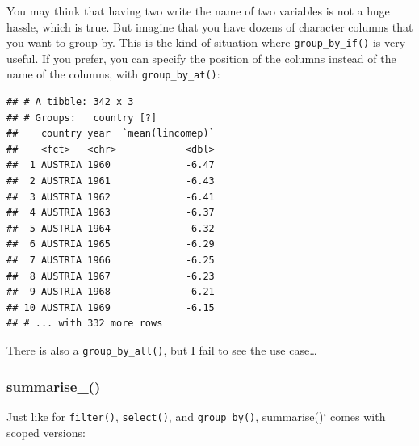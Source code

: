 \documentclass[]{gitbook}
\newenvironment{Shaded}{\begin{snugshade}}{\end{snugshade}}
\newcommand{\DecValTok}[1]{\textcolor[rgb]{0.00,0.00,0.81}{#1}}
\newcommand{\KeywordTok}[1]{\textcolor[rgb]{0.13,0.29,0.53}{\textbf{#1}}}
\newcommand{\NormalTok}[1]{#1}
\newcommand{\OperatorTok}[1]{\textcolor[rgb]{0.81,0.36,0.00}{\textbf{#1}}}
\newcommand{\StringTok}[1]{\textcolor[rgb]{0.31,0.60,0.02}{#1}}
\theoremstyle{definition}
\theoremstyle{definition}
\theoremstyle{definition}
\theoremstyle{remark}
\begin{document}
You may think that having two write the name of two variables is not a
huge hassle, which is true. But imagine that you have dozens of
character columns that you want to group by. This is the kind of
situation where \texttt{group\_by\_if()} is very useful. If you prefer,
you can specify the position of the columns instead of the name of the
columns, with \texttt{group\_by\_at()}:

\begin{Shaded}
\end{Shaded}

\begin{verbatim}
## # A tibble: 342 x 3
## # Groups:   country [?]
##    country year  `mean(lincomep)`
##    <fct>   <chr>            <dbl>
##  1 AUSTRIA 1960             -6.47
##  2 AUSTRIA 1961             -6.43
##  3 AUSTRIA 1962             -6.41
##  4 AUSTRIA 1963             -6.37
##  5 AUSTRIA 1964             -6.32
##  6 AUSTRIA 1965             -6.29
##  7 AUSTRIA 1966             -6.25
##  8 AUSTRIA 1967             -6.23
##  9 AUSTRIA 1968             -6.21
## 10 AUSTRIA 1969             -6.15
## # ... with 332 more rows
\end{verbatim}

There is also a \texttt{group\_by\_all()}, but I fail to see the use
case\ldots{}

\hypertarget{summarise_}{%
\subsubsection{summarise\_()}\label{summarise_}}

Just like for \texttt{filter()}, \texttt{select()}, and
\texttt{group\_by()}, summarise()` comes with scoped versions:

\begin{Shaded}
\end{Shaded}
\end{document}
